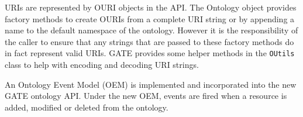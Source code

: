 URIs are represented by OURI objects in the API. The Ontology object provides
factory methods to create OURIs from a complete URI string or by appending a
name to the default namespace of the ontology.  However it is the
responsibility of the caller to ensure that any strings that are passed to
these factory methods do in fact represent valid URIs.  GATE provides some
helper methods in the {\tt OUtils} class to help with encoding and decoding URI
strings.


An Ontology Event Model (OEM) is implemented and incorporated into the
new GATE ontology API. Under the new OEM, events are fired
when a resource is added, modified or deleted from the ontology.

